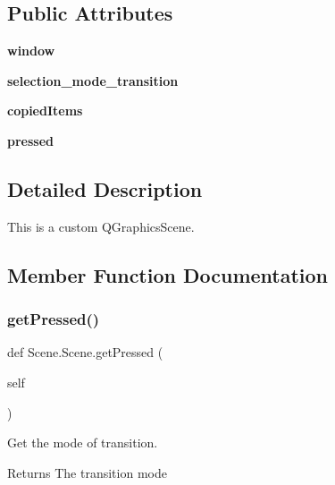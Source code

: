 \subsection*{Public Attributes}
\begin{DoxyCompactItemize}
\item 
\mbox{\label{classScene_1_1Scene_a64303ac2422d8f9e865ef7e9626d4ac0}} 
{\bfseries window}
\item 
\mbox{\label{classScene_1_1Scene_a19ce1293b6d8455202d57820a8aaf950}} 
{\bfseries selection\+\_\+mode\+\_\+transition}
\item 
\mbox{\label{classScene_1_1Scene_af1909d021b33e9d5eab0e72a5eeddc12}} 
{\bfseries copied\+Items}
\item 
\mbox{\label{classScene_1_1Scene_a9aed0126be8d2ba77a564d2b9c40e4c8}} 
{\bfseries pressed}
\end{DoxyCompactItemize}


\subsection{Detailed Description}
This is a custom Q\+Graphics\+Scene. 

\subsection{Member Function Documentation}
\mbox{\label{classScene_1_1Scene_a3f33b984679ec9f8c767f237df400026}} 
\subsubsection{\texorpdfstring{getPressed()}{getPressed()}}
{\footnotesize\ttfamily def Scene.\+Scene.\+get\+Pressed (\begin{DoxyParamCaption}\item[{}]{self }\end{DoxyParamCaption})}



Get the mode of transition. 

\begin{DoxyReturn}{Returns}
The transition mode 
\end{DoxyReturn}
\mbox{\label{classScene_1_1Scene_ad333ae8b06d17a6172cacc4606f13d9f}} 
